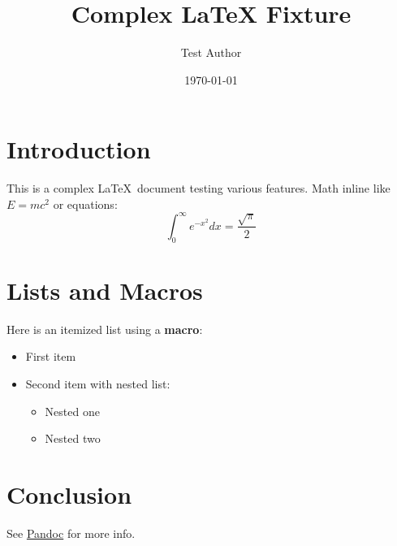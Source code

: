 \documentclass{article}
\title{Complex LaTeX Fixture}
\author{Test Author}
\date{\today}
\begin{document}
\maketitle
\section{Introduction}
This is a complex \LaTeX\ document testing various features. Math inline like $E=mc^2$ or equations:
\begin{equation}
\int_{0}^{\infty} e^{-x^2} dx = \frac{\sqrt{\pi}}{2}
\end{equation}
\section{Lists and Macros}
\newcommand{\custommacro}[1]{\textbf{#1}}
Here is an itemized list using a \custommacro{macro}:
\begin{itemize}
    \item First item
    \item Second item with nested list:
    \begin{itemize}
        \item Nested one
        \item Nested two
    \end{itemize}
\end{itemize}
\section{Conclusion}
See \href{https://pandoc.org}{Pandoc} for more info.
\end{document}

